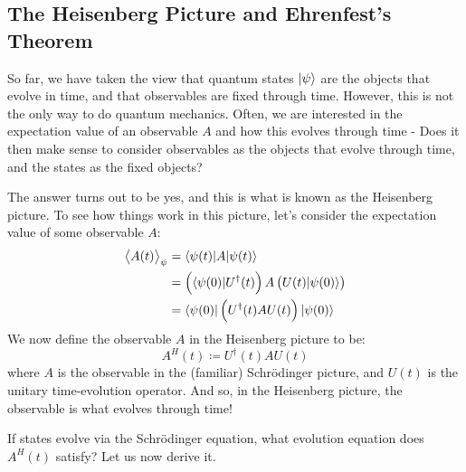 \subsection{The Heisenberg Picture and Ehrenfest's Theorem}
So far, we have taken the view that quantum states $\lvert \psi \rangle$ are the objects that evolve in time, and that observables are fixed through time. However, this is not the only way to do quantum mechanics. Often, we are interested in the expectation value of an observable $A$ and how this evolves through time -  Does it then make sense to consider observables as the objects that evolve through time, and the states as the fixed objects?

The answer turns out to be yes, and this is what is known as the Heisenberg picture. To see how things work in this picture, let's consider the expectation value of some observable $A$:
\begin{equation}
    \begin{split}
        \left< A(t) \right>_\psi &= \langle \psi(t) \rvert A\lvert \psi(t) \rangle
        \\ &= \left(\langle \psi(0) \rvert U^\dag(t)\right)A\left(U(t)\lvert \psi(0) \rangle\right)
        \\ &= \langle \psi(0) \rvert\left(U^\dag(t)A U(t)\right)\lvert \psi(0) \rangle
    \end{split}
\end{equation}
We now define the observable $A$ in the Heisenberg picture to be:
\begin{equation}
    A^H(t) \coloneqq U^\dag(t)A U(t)
\end{equation}
where $A$ is the observable in the (familiar) Schr\"{o}dinger picture, and $U(t)$ is the unitary time-evolution operator. And so, in the Heisenberg picture, the observable is what evolves through time!

If states evolve via the Schr\"{o}dinger equation, what evolution equation does $A^H(t)$ satisfy? Let us now derive it.

